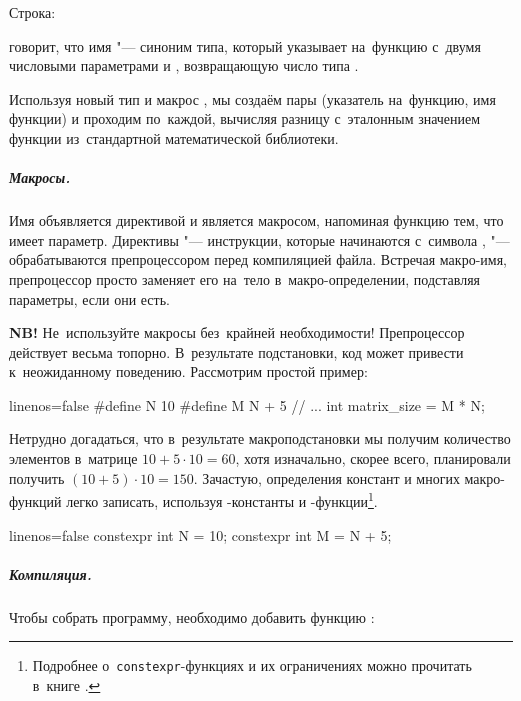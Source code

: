 \noindent Строка:

\noindent говорит, что имя  "--- синоним типа, который указывает на~функцию с~двумя числовыми параметрами  и , возвращающую число типа .

Используя новый тип  и макрос , мы создаём пары (указатель на~функцию, имя функции) и проходим по~каждой, вычисляя разницу с~эталонным значением функции  из~стандартной математической библиотеки.



\subparagraph{Макросы.}\label{par:macro}
Имя  объявляется директивой  и является макросом, напоминая функцию тем, что имеет параметр. Директивы "--- инструкции, которые начинаются с~символа \code{\#}, "--- обрабатываются препроцессором перед компиляцией файла. Встречая макро-имя, препроцессор просто заменяет его на~тело в~макро-определении, подставляя параметры, если они есть.

\textbf{NB!} Не~используйте макросы без~крайней необходимости! Препроцессор действует весьма топорно. В~результате подстановки, код может привести к~неожиданному поведению. Рассмотрим простой пример:

\begin{cppcode*}{linenos=false}
#define N 10
#define M N + 5
// ...
int matrix_size = M * N;
\end{cppcode*}

\noindent Нетрудно догадаться, что в~результате макроподстановки мы получим количество элементов в~матрице \(10 + 5\cdot 10 = 60\), хотя изначально, скорее всего, планировали получить \((10 + 5)\cdot 10 = 150\). Зачастую, определения констант и многих макро-функций легко записать, используя -константы и -функции\footnote{Подробнее о~\texttt{constexpr}-функциях и их ограничениях можно прочитать в~книге \cite{Meyers:2016:ru, Stroustrup:2013:en}.}.
\enlargethispage{1\baselineskip}

\begin{cppcode*}{linenos=false}
constexpr int N = 10;
constexpr int M = N + 5;
\end{cppcode*}



\subparagraph{Компиляция.}
Чтобы собрать программу, необходимо добавить функцию :

